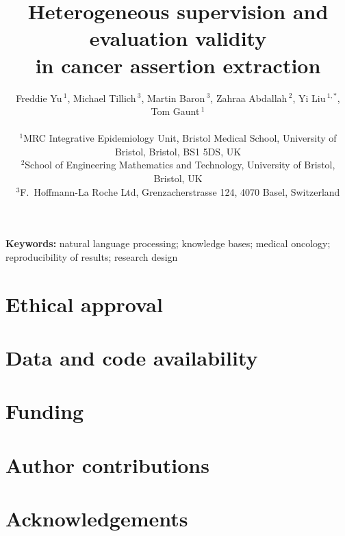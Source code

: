 \documentclass[11pt,twoside]{article}
\title{%
  \textbf{Heterogeneous supervision and evaluation validity \\
          in cancer assertion extraction}
}
\author{%
  Freddie Yu\,$^{1}$,
  Michael Tillich\,$^{3}$,
  Martin Baron\,$^{3}$,
  Zahraa Abdallah\,$^{2}$,
  Yi Liu\,$^{1,*}$,
  Tom Gaunt\,$^{1}$
  \\[6pt]
  \begin{minipage}{0.92\textwidth}\centering\small
    $^{1}$MRC Integrative Epidemiology Unit, Bristol Medical School,
    University of Bristol, Bristol, BS1 5DS, UK \\
    $^{2}$School of Engineering Mathematics and Technology,
    University of Bristol, Bristol, UK \\
    $^{3}$F.\ Hoffmann-La Roche Ltd, Grenzacherstrasse 124,
    4070 Basel, Switzerland
  \end{minipage}
}
\date{}
\begin{document}
\maketitle
\thispagestyle{plain}

\begin{abstract}

\end{abstract}

\smallskip
\noindent\textbf{Keywords:}
natural language processing;
knowledge bases;
medical oncology;
reproducibility of results;
research design

\vspace{1.0em}







\section*{Ethical approval}


\section*{Data and code availability}


\section*{Funding}


\section*{Author contributions}


\section*{Acknowledgements}




\end{document}
